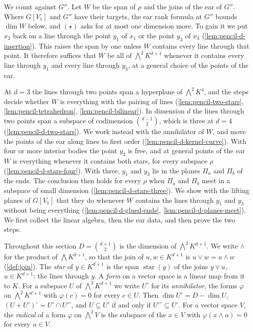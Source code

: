 We count against $G''$. Let $W$ be the span of $\rho$ and the joins of
the ear of $G''$. Where $G[V_1]$ and $G''$ have their targets, the ear
rank formula at $G''$ bounds $\dim W$ below, and $(\star)$ asks for at
most one dimension more. To gain it we put $x_2$ back on a line through
the point $y_1$ of $x_1$ or the point $y_3$ of $x_3$
(\cref{lem:pencil-d-insertion}). This raises the span by one unless $W$
contains every line through that point. It therefore suffices that $W$
be all of $\bigwedge^2 K^{d+1}$ whenever it contains every line through
$y_1$ and every line through $y_3$, at a general choice of the points of
the ear.

At $d = 3$ the lines through two points span a hyperplane of
$\bigwedge^2 K^4$, and the steps decide whether $W$ is everything with
the pairing of lines (\cref{lem:pencil-two-stars},
\cref{lem:pencil-tetrahedron}, \cref{lem:pencil-bilinear}). In dimension
$d$ the lines through two points span a subspace of codimension
$\binom{d-1}{2}$, which is three at $d = 4$
(\cref{lem:pencil-d-two-stars}). We work instead with the annihilator of
$W$, and move the points of the ear along lines to first order
(\cref{lem:pencil-d-kernel-curve}). With four or more interior bodies the
point $y_3$ is free, and at general points of the ear $W$ is everything
whenever it contains both stars, for every subspace $\rho$
(\cref{lem:pencil-d-stars-four}). With three,
$y_1$ and $y_3$ lie in the planes $\Pi_a$ and $\Pi_b$ of the ends. The
conclusion then holds for every $\rho$ when $\Pi_a$ and $\Pi_b$ meet in a
subspace of small dimension (\cref{lem:pencil-d-stars-three}). We show
with the lifting planes of $G[V_1]$ that they do whenever $W$ contains
the lines through $y_1$ and $y_3$ without being everything
(\cref{lem:pencil-d-glued-ends}, \cref{lem:pencil-d-planes-meet}). We
first collect the linear algebra, then the ear data, and then prove the
two steps.

Throughout this section $D = \binom{d+1}{2}$ is the dimension of
$\bigwedge^2 K^{d+1}$. We write $\wedge$ for the product of
$\bigwedge K^{d+1}$, so that the join of $u, w \in K^{d+1}$ is
$u \vee w = u \wedge w$ (\cref{def:join}). The \emph{star} of
$y \in K^{d+1}$ is the span $\operatorname{star}(y)$ of the joins
$y \vee u$, $u \in K^{d+1}$: the lines through $y$. A \emph{form} on a
vector space is a linear map from it to $K$. For a subspace $U$ of
$\bigwedge^2 K^{d+1}$ we write $U^{\circ}$ for its \emph{annihilator},
the forms $\varphi$ on $\bigwedge^2 K^{d+1}$ with $\varphi(c) = 0$ for
every $c \in U$. Then $\dim U^{\circ} = D - \dim U$,
$(U + U')^{\circ} = U^{\circ} \cap U'^{\circ}$, and $U \subseteq U'$ if
and only if $U'^{\circ} \subseteq U^{\circ}$. For a vector space $V$,
the \emph{radical} of a form $\varphi$ on $\bigwedge^2 V$ is the subspace
of the $x \in V$ with $\varphi(x \wedge u) = 0$ for every $u \in V$.


